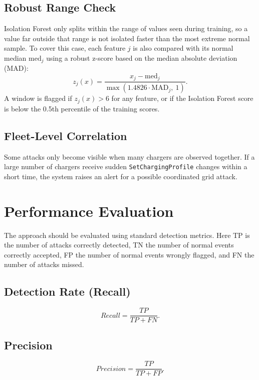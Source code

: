 \documentclass[runningheads]{llncs}
\begin{document}
\subsection{Robust Range Check}
Isolation Forest only splits within the range of values seen during training, so a value far outside that range is not isolated faster than the most extreme normal sample. To cover this case, each feature $j$ is also compared with its normal median $\mathrm{med}_j$ using a robust z-score based on the median absolute deviation (MAD):
\begin{equation}
z_j(x) = \frac{x_j - \mathrm{med}_j}{\max(1.4826 \cdot \mathrm{MAD}_j,\ 1)}.
\end{equation}
A window is flagged if $z_j(x) > 6$ for any feature, or if the Isolation Forest score is below the 0.5th percentile of the training scores.

\subsection{Fleet-Level Correlation}
Some attacks only become visible when many chargers are observed together. If a large number of chargers receive sudden \texttt{SetChargingProfile} changes within a short time, the system raises an alert for a possible coordinated grid attack.

\section{Performance Evaluation}
The approach should be evaluated using standard detection metrics. Here TP is the number of attacks correctly detected, TN the number of normal events correctly accepted, FP the number of normal events wrongly flagged, and FN the number of attacks missed.

\subsection{Detection Rate (Recall)}
\begin{equation}
\mathit{Recall} = \frac{TP}{TP + FN}.
\end{equation}

\subsection{Precision}
\begin{equation}
\mathit{Precision} = \frac{TP}{TP + FP}.
\end{equation}
\end{document}

